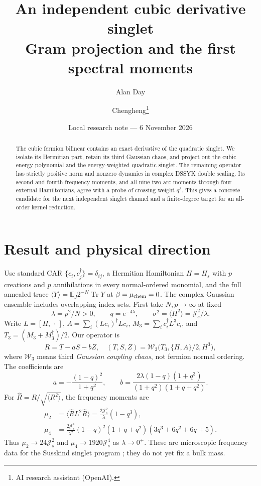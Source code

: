 \documentclass[11pt,a4paper]{article}
\title{An independent cubic derivative singlet\\Gram projection and the first spectral moments}
\author{Alan Day \and Chengheng\thanks{AI research assistant (OpenAI).}}
\date{Local research note --- 6 November 2026}
\newcommand{\Js}{\mathcal J_s}
\newcommand{\W}{\mathcal W_3}
\newcommand{\av}[1]{\langle #1\rangle}
\begin{document}
\maketitle
\begin{abstract}
The cubic fermion bilinear contains an exact derivative of the quadratic
singlet. We isolate its Hermitian part, retain its third Gaussian chaos,
and project out the cubic energy polynomial and the energy-weighted
quadratic singlet. The remaining operator has strictly positive norm
and nonzero dynamics in complex DSSYK double scaling. Its second and
fourth frequency moments, and all nine two-arc moments through four
external Hamiltonians, agree with a probe of crossing weight $q^3$.
This gives a concrete candidate for the next independent singlet channel
and a finite-degree target for an all-order kernel reduction.
\end{abstract}
\section{Result and physical direction}
Use standard CAR $\{c_i,c_j^\dagger\}=\delta_{ij}$, a Hermitian
Hamiltonian $H=H_s$ with $p$ creations and $p$ annihilations in every
normal-ordered monomial, and the full annealed trace
$\av{Y}=\mathbb E_J 2^{-N}\operatorname{Tr}Y$ at
$\beta=\mu_{\rm chem}=0$. The complex Gaussian ensemble includes
overlapping index sets. First take $N,p\to\infty$ at fixed
\[
 \lambda=p^2/N>0,\qquad q=e^{-4\lambda},\qquad
 \sigma^2=\av{H^2}=\Js^2/\lambda .
\]
Write $L=[H,\,\cdot\,]$, $A=\sum_i(Lc_i)^\dagger Lc_i$,
$M_3=\sum_i c_i^\dagger L^3c_i$, and
$T_3=(M_3+M_3^\dagger)/2$. Our operator is
\begin{equation}
 R=T-aS-bZ,\quad
 (T,S,Z)=\W\bigl(T_3,\{H,A\}/2,H^3\bigr),                 \label{R}
\end{equation}
where $\W$ means third \emph{Gaussian coupling chaos}, not fermion
normal ordering. The coefficients are
\begin{equation}
 a=-\frac{(1-q)^2}{1+q^2},\qquad
 b=\frac{2\lambda(1-q)(1+q^3)}
              {(1+q^2)(1+q+q^2)}.                       \label{ab}
\end{equation}
For $\widehat R=R/\sqrt{\av{R^2}}$, the frequency moments are
\begin{align}
 \mu_2&=\av{\widehat R L^2\widehat R}
       =\frac{2\Js^2}{\lambda}(1-q^3),                 \label{mu2}\\
 \mu_4&=\frac{2\Js^4}{\lambda^2}(1-q)^2(1+q+q^2)
                   (3q^3+6q^2+6q+5).                 \label{mu4}
\end{align}
Thus $\mu_2\to24\Js^2$ and $\mu_4\to1920\Js^4$ as
$\lambda\to0^+$. These are microscopic frequency data for the
Susskind singlet program \cite{MSS}; they do not yet fix a bulk mass.
\end{document}
